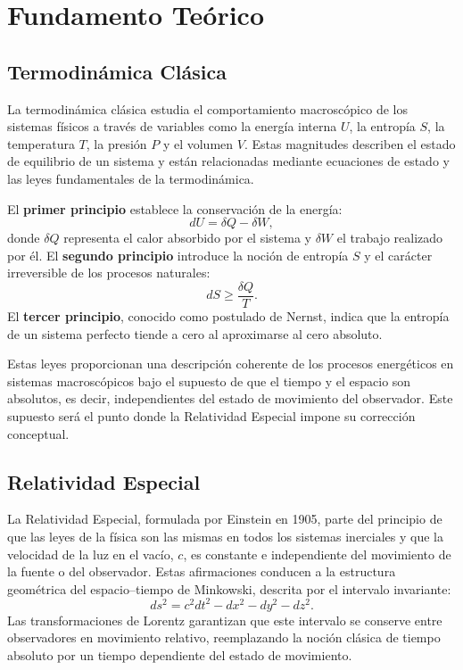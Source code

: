 \section{Fundamento Teórico}

\subsection{Termodinámica Clásica}

La termodinámica clásica estudia el comportamiento macroscópico de los sistemas físicos a través de variables como la energía interna $U$, la entropía $S$, la temperatura $T$, la presión $P$ y el volumen $V$.  
Estas magnitudes describen el estado de equilibrio de un sistema y están relacionadas mediante ecuaciones de estado y las leyes fundamentales de la termodinámica.

El \textbf{primer principio} establece la conservación de la energía:
\[
dU = \delta Q - \delta W,
\]
donde $\delta Q$ representa el calor absorbido por el sistema y $\delta W$ el trabajo realizado por él.  
El \textbf{segundo principio} introduce la noción de entropía $S$ y el carácter irreversible de los procesos naturales:
\[
dS \geq \frac{\delta Q}{T}.
\]
El \textbf{tercer principio}, conocido como postulado de Nernst, indica que la entropía de un sistema perfecto tiende a cero al aproximarse al cero absoluto.

Estas leyes proporcionan una descripción coherente de los procesos energéticos en sistemas macroscópicos bajo el supuesto de que el tiempo y el espacio son absolutos, es decir, independientes del estado de movimiento del observador.  
Este supuesto será el punto donde la Relatividad Especial impone su corrección conceptual.

\subsection{Relatividad Especial}

La Relatividad Especial, formulada por Einstein en 1905, parte del principio de que las leyes de la física son las mismas en todos los sistemas inerciales y que la velocidad de la luz en el vacío, $c$, es constante e independiente del movimiento de la fuente o del observador.  
Estas afirmaciones conducen a la estructura geométrica del espacio–tiempo de Minkowski, descrita por el intervalo invariante:
\[
ds^2 = c^2 dt^2 - dx^2 - dy^2 - dz^2.
\]
Las transformaciones de Lorentz garantizan que este intervalo se conserve entre observadores en movimiento relativo, reemplazando la noción clásica de tiempo absoluto por un tiempo dependiente del estado de movimiento.


